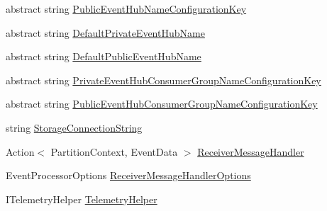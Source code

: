 \begin{DoxyCompactItemize}
\item 
abstract string \hyperlink{classCqrs_1_1Azure_1_1ServiceBus_1_1AzureEventHub_a3ef1f56ad3de3bf8337f68e73627fab2}{Public\+Event\+Hub\+Name\+Configuration\+Key}
\item 
abstract string \hyperlink{classCqrs_1_1Azure_1_1ServiceBus_1_1AzureEventHub_a8912bae90f45042ed41ff7a7632c178f}{Default\+Private\+Event\+Hub\+Name}
\item 
abstract string \hyperlink{classCqrs_1_1Azure_1_1ServiceBus_1_1AzureEventHub_a11645c85a3c749ca664480867c6fae3c}{Default\+Public\+Event\+Hub\+Name}
\item 
abstract string \hyperlink{classCqrs_1_1Azure_1_1ServiceBus_1_1AzureEventHub_ad2095d284821cff883fef5a2a5aec90e}{Private\+Event\+Hub\+Consumer\+Group\+Name\+Configuration\+Key}
\item 
abstract string \hyperlink{classCqrs_1_1Azure_1_1ServiceBus_1_1AzureEventHub_a36b035065fd3fc38ac136adc59742d34}{Public\+Event\+Hub\+Consumer\+Group\+Name\+Configuration\+Key}
\item 
string \hyperlink{classCqrs_1_1Azure_1_1ServiceBus_1_1AzureEventHub_a2b102538e8b72f9990578fa3bcbe4c12}{Storage\+Connection\+String}
\item 
Action$<$ Partition\+Context, Event\+Data $>$ \hyperlink{classCqrs_1_1Azure_1_1ServiceBus_1_1AzureEventHub_a8c9faa7096d72a45803e6e63a1b3cf30}{Receiver\+Message\+Handler}
\item 
Event\+Processor\+Options \hyperlink{classCqrs_1_1Azure_1_1ServiceBus_1_1AzureEventHub_ad3a0c2f32d5771fb1f4420fc33c75968}{Receiver\+Message\+Handler\+Options}
\item 
I\+Telemetry\+Helper \hyperlink{classCqrs_1_1Azure_1_1ServiceBus_1_1AzureEventHub_a4cf19edac088c5ea74408398b3dfd4a2}{Telemetry\+Helper}
\end{DoxyCompactItemize}


